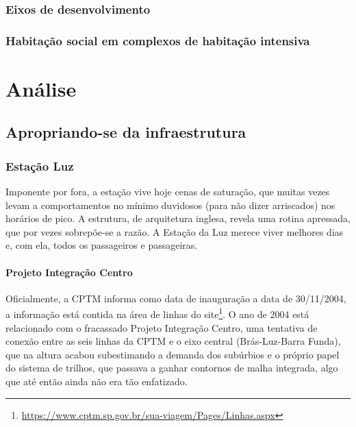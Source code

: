 \documentclass[11pt,fleqn]{book} %
\begin{document}
\lipsum[3-4]

\section{Eixos de desenvolvimento}

\lipsum[3-4]

\section{Habitação social em complexos de habitação intensiva}

\lipsum[3-4]


\part{Análise}

\chapter{Apropriando-se da infraestrutura}

\section{Estação Luz}

Imponente por fora, a estação vive hoje cenas de saturação, que muitas vezes levam a comportamentos no mínimo duvidosos (para não dizer arriscados) nos horários de pico. A estrutura, de arquitetura inglesa, revela uma rotina apressada, que por vezes sobrepõe-se a razão. A Estação da Luz merece viver melhores dias e, com ela, todos os passageiros e passageiras.

\subsection{Projeto Integração Centro}

Oficialmente, a CPTM informa como data de inauguração a data de 30/11/2004, a informação está contida na área de linhas do site\footnote{\url{https://www.cptm.sp.gov.br/sua-viagem/Pages/Linhas.aspx}}. O ano de 2004 está relacionado com o fracassado Projeto Integração Centro, uma tentativa de conexão entre as seis linhas da CPTM e o eixo central (Brás-Luz-Barra Funda), que na altura acabou subestimando a demanda dos subúrbios e o próprio papel do sistema de trilhos, que passava a ganhar contornos de malha integrada, algo que até então ainda não era tão enfatizado.
\end{document}

